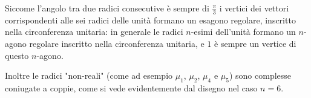 Siccome l'angolo tra due radici consecutive è sempre di $\frac{\pi}3$ i vertici dei vettori corrispondenti alle sei radici delle unità formano un esagono regolare, inscritto nella circonferenza unitaria: in generale le radici $n$-esimi dell'unità formano un $n$-agono regolare inscritto nella circonferenza unitaria, e $1$ è sempre un vertice di questo $n$-agono.

Inoltre le radici "non-reali" (come ad esempio $\mu_1$, $\mu_2$, $\mu_4$ e $\mu_5$) sono complesse coniugate a coppie, come si vede evidentemente dal disegno nel caso $n = 6$.